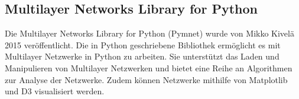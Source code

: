 \subsection{Multilayer Networks Library for Python}

Die Multilayer Networks Library for Python (Pymnet) wurde von Mikko Kivelä 2015 veröffentlicht. 
Die in Python geschriebene Bibliothek ermöglicht es mit Multilayer Netzwerke in Python zu arbeiten. Sie unterstützt das Laden und Manipulieren von Multilayer Netzwerken und bietet eine Reihe an Algorithmen zur Analyse der Netzwerke.
Zudem können Netzwerke mithilfe von Matplotlib und D3 visualisiert werden.
